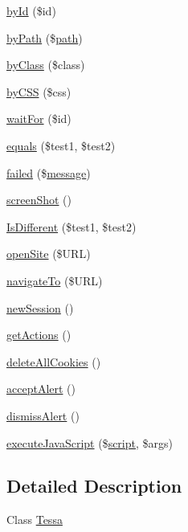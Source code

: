 \begin{DoxyCompactItemize}
\hyperlink{classTessa_ae146b22ed7951b61143efd7073d0ea2c}{by\+Id} (\$id)
\item 
\hyperlink{classTessa_a91a3e45138fd2f8325a2a94c4a6ba617}{by\+Path} (\$\hyperlink{Shape_8php_a3b05eec13add53df44e232273d718ae4}{path})
\item 
\hyperlink{classTessa_ac535720770b7bed0ea1120aa121c7ea8}{by\+Class} (\$class)
\item 
\hyperlink{classTessa_af0f1f7c19711f0527bd1372a096038bd}{by\+C\+S\+S} (\$css)
\item 
\hyperlink{classTessa_a71e812fa28e3bdb00c6b2b2ee99cbead}{wait\+For} (\$id)
\item 
\hyperlink{classTessa_a6cc78554f7d5d4a07582b20aed6fcc82}{equals} (\$test1, \$test2)
\item 
\hyperlink{classTessa_a3454246c38eb3976f01d1e9db22cdc4f}{failed} (\$\hyperlink{classTessa_a7e4c039b8228d75810747b96b5062366}{message})
\item 
\hyperlink{classTessa_a410bf71687fffc9d1c5bd674df222eba}{screen\+Shot} ()
\item 
\hyperlink{classTessa_accf6a6c6874c25022b628bc81918a9d0}{Is\+Different} (\$test1, \$test2)
\item 
\hyperlink{classTessa_a98467e5342f835681757cc6d5dfd65ea}{open\+Site} (\$U\+R\+L)
\item 
\hyperlink{classTessa_a97458882c7e72f41358c7991e560be29}{navigate\+To} (\$U\+R\+L)
\item 
\hyperlink{classTessa_ac3a16f8c732b364c4feca92c2f71cc7e}{new\+Session} ()
\item 
\hyperlink{classTessa_a3fce6a71a2303c0bccd0d447375d1c96}{get\+Actions} ()
\item 
\hyperlink{classTessa_ae158939762eb598225ed156a23f95fc2}{delete\+All\+Cookies} ()
\item 
\hyperlink{classTessa_ac6310dd007ead434f3d8cd2698263ded}{accept\+Alert} ()
\item 
\hyperlink{classTessa_a4fbf1f0db39dcb95c2f8c51d73f0b02f}{dismiss\+Alert} ()
\item 
\hyperlink{classTessa_a14a21a710a7eece5d01eb93a010c896e}{execute\+Java\+Script} (\$\hyperlink{Shape_8php_ac2a3056c7a62af99ebe52fdaa4e2e4da}{script}, \$args)
\end{DoxyCompactItemize}


\subsection{Detailed Description}
Class \hyperlink{classTessa}{Tessa} 

